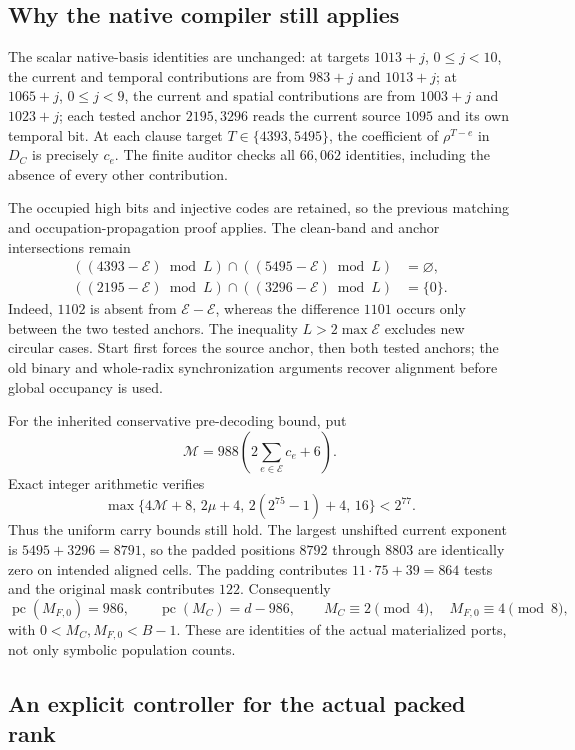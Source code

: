 \subsection{Why the native compiler still applies}

The scalar native-basis identities are unchanged: at targets $1013+j$,
$0\le j<10$, the current and temporal contributions are from $983+j$
and $1013+j$; at $1065+j$, $0\le j<9$, the current and spatial
contributions are from $1003+j$ and $1023+j$; each tested anchor
$2195,3296$ reads the current source $1095$ and its own temporal bit.
At each clause target $T\in\{4393,5495\}$, the coefficient of
$\rho^{T-e}$ in $D_C$ is precisely $c_e$.  The finite auditor checks all
$66{,}062$ identities, including the absence of every other contribution.

The occupied high bits and injective codes are retained, so the previous
matching and occupation-propagation proof applies.  The clean-band and
anchor intersections remain
\begin{align*}
 ((4393-\mathcal E)\bmod L)
       \cap((5495-\mathcal E)\bmod L)&=\varnothing,\\
 ((2195-\mathcal E)\bmod L)
       \cap((3296-\mathcal E)\bmod L)&=\{0\}.
\end{align*}
Indeed, $1102$ is absent from $\mathcal E-\mathcal E$, whereas the
difference $1101$ occurs only between the two tested anchors.  The
inequality $L>2\max\mathcal E$ excludes new circular cases.  Start first
forces the source anchor, then both tested anchors; the old binary and
whole-radix synchronization arguments recover alignment before global
occupancy is used.

For the inherited conservative pre-decoding bound, put
\[
 \mathcal M=988\left(2\sum_{e\in\mathcal E}c_e+6\right).
\]
Exact integer arithmetic verifies
\[
 \max\{4\mathcal M+8,\,2\mu+4,\,2(2^{75}-1)+4,\,16\}<2^{77}.
\]
Thus the uniform carry bounds still hold.  The largest unshifted current
exponent is $5495+3296=8791$, so the padded positions $8792$ through
$8803$ are identically zero on intended aligned cells.  The padding
contributes $11\cdot75+39=864$ tests and the original mask contributes
$122$.  Consequently
\[
 \operatorname{pc}(M_{F,0})=986,\qquad
 \operatorname{pc}(M_C)=d-986,\qquad
 M_C\equiv2\pmod4,\quad M_{F,0}\equiv4\pmod8,
\]
with $0<M_C,M_{F,0}<B-1$.  These are identities of the actual materialized
ports, not only symbolic population counts.

\subsection{An explicit controller for the actual packed rank}

